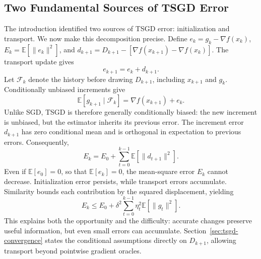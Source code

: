 \subsection{Two Fundamental Sources of TSGD Error}
\label{subsec:martingale-interpretation}

The introduction identified two sources of TSGD error: initialization
and transport. We now make this decomposition precise.
Define $e_k=g_k-\nabla f(x_k)$, $E_k=\mathbb E[\|e_k\|^2]$, and
$d_{k+1}=D_{k+1}-[\nabla f(x_{k+1})-\nabla f(x_k)]$.
The transport update gives
\begin{equation}
\label{eq:estimation-error-recursion}
\boxed{e_{k+1}=e_k+d_{k+1}.}
\end{equation}
Let $\mathcal F_k$ denote the history before drawing $D_{k+1}$,
including $x_{k+1}$ and $g_k$. Conditionally unbiased increments give
\[
\mathbb E[g_{k+1}\mid\mathcal F_k]
=\nabla f(x_{k+1})+e_k.
\]
Unlike SGD, TSGD is therefore generally conditionally biased:
the new increment is unbiased, but the estimator inherits its previous
error. The increment error $d_{k+1}$ has zero conditional mean and is
orthogonal in expectation to previous errors. Consequently,
\begin{equation}
\label{eq:transport-error-identity}
E_k=E_0+\sum_{t=0}^{k-1}\mathbb E[\|d_{t+1}\|^2].
\end{equation}
Even if $\mathbb E[e_0]=0$, so that $\mathbb E[e_k]=0$, the
mean-square error $E_k$ cannot decrease. Initialization error persists,
while transport errors accumulate.
Similarity bounds each contribution by the squared displacement, yielding
\begin{equation}
\label{eq:transport-error-growth}
E_k\leq E_0+\delta^2\sum_{t=0}^{k-1}
\eta_t^2\mathbb E[\|g_t\|^2].
\end{equation}
This explains both the opportunity and the difficulty: accurate changes
preserve useful information, but even small errors can accumulate.
Section~\ref{sec:tsgd-convergence} states the conditional assumptions
directly on $D_{k+1}$, allowing transport beyond pointwise gradient oracles.
